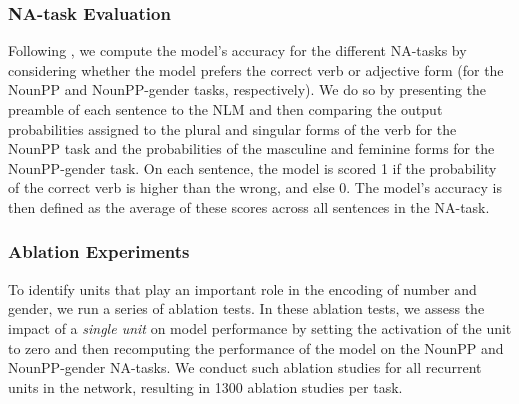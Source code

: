\subsubsection{NA-task Evaluation}
Following \citet{Linzen:etal:2016}, we compute the model's accuracy for the different NA-tasks by considering whether the model prefers the correct verb or adjective form (for the NounPP and NounPP-gender tasks, respectively).
We do so by presenting the preamble of each sentence to the NLM and then comparing the output probabilities assigned to the plural and singular forms of the verb for the NounPP task and the probabilities of the masculine and feminine forms for the NounPP-gender task.
On each sentence, the model is scored 1 if the probability of the correct verb is higher than the wrong, and else 0. 
The model's accuracy is then defined as the average of these scores across all sentences in the NA-task. 

\subsubsection{Ablation Experiments}
To identify units that play an important role in the encoding of number and gender, we run a series of ablation tests.
In these ablation tests, we assess the impact of a \emph{single unit} on model performance by setting the activation of the unit to zero and then recomputing the performance of the model on the NounPP and NounPP-gender NA-tasks. 
We conduct such ablation studies for all recurrent units in the network, resulting in 1300 ablation studies per task.

